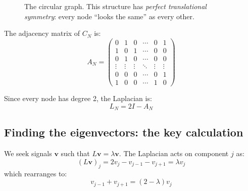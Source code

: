 \begin{notechapter}
\begin{figure}[H]
\caption{The circular graph. This structure has \emph{perfect
         translational symmetry}: every node ``looks the same'' as
         every other.}
\label{dft-to-gnn:fig:circular-graph}
\end{figure}

The adjacency matrix of $C_N$ is:
\begin{equation}
A_N = \begin{pmatrix}
0 & 1 & 0 & \cdots & 0 & 1 \\
1 & 0 & 1 & \cdots & 0 & 0 \\
0 & 1 & 0 & \cdots & 0 & 0 \\
\vdots & \vdots & \vdots & \ddots & \vdots & \vdots \\
0 & 0 & 0 & \cdots & 0 & 1 \\
1 & 0 & 0 & \cdots & 1 & 0
\end{pmatrix}
\end{equation}

Since every node has degree 2, the Laplacian is:
\begin{equation}
L_N = 2I - A_N
\end{equation}

\subsection{Finding the eigenvectors: the key calculation}

We seek signals $\mathbf{v}$ such that $L\mathbf{v} = \lambda\mathbf{v}$.
The Laplacian acts on component $j$ as:
\begin{equation}
(L\mathbf{v})_j = 2v_j - v_{j-1} - v_{j+1} = \lambda v_j
\end{equation}
which rearranges to:
\begin{equation}
v_{j-1} + v_{j+1} = (2 - \lambda) v_j
\label{dft-to-gnn:eq:recurrence}
\end{equation}


\end{notechapter}
